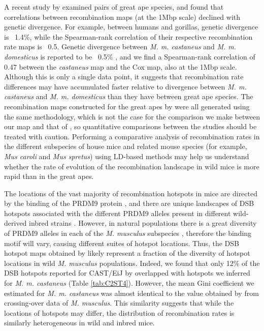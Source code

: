 A recent study by \cite{RN221} examined pairs of great ape species, and found that correlations between recombination maps (at the 1Mbp scale) declined with genetic divergence. For example, between humans and gorillas, genetic divergence is ~1.4\%, while the Spearman-rank correlation of their respective recombination rate maps is ~0.5. Genetic divergence between \textit{M. m. castaneus} and \textit{M. m. domesticus} is reported to be ~0.5\% \citep{RN255}, and we find a Spearman-rank correlation of 0.47 between the \textit{castaneus} map and the Cox map, also at the 1Mbp scale. Although this is only a single data point, it suggests that recombination rate differences may have accumulated faster relative to divergence between \textit{M. m. castaneus} and \textit{M. m. domesticus} than they have between great ape species. The recombination maps constructed for the great apes by \cite{RN221}  were all generated using the same methodology, which is not the case for the comparison we make between our map and that of \cite{RN232}, so quantitative comparisons between the studies should be treated with caution. Performing a comparative analysis of recombination rates in the different subspecies of house mice and related mouse species (for example, \textit{Mus caroli} and \textit{Mus spretus}) using LD-based methods may help us understand whether the rate of evolution of the recombination landscape in wild mice is more rapid than in the great apes.

The locations of the vast majority of recombination hotspots in mice are directed by the binding of the PRDM9 protein \citep{RN254}, and there are unique landscapes of DSB hotspots associated with the different PRDM9 alleles present in different wild-derived inbred strains \citep{RN249}. However, in natural populations there is a great diversity of PRDM9 alleles in each of the \textit{M. musculus} subspecies \citep{RN292}, therefore the binding motif will vary, causing different suites of hotspot locations. Thus, the DSB hotspot maps obtained by \cite{RN249} likely represent a fraction of the diversity of hotspot locations in wild \textit{M. musculus} populations. Indeed, we found that only 12\% of the DSB hotspots reported for CAST/EiJ by \cite{RN249} overlapped with hotspots we inferred for \textit{M. m. castaneus} (Table \ref{tab:C2ST4}). However, the mean Gini coefficient we estimated for \textit{M. m. castaneus} was almost identical to the value obtained by \cite{RN333} from crossing-over data of \textit{M. musculus}. This similarity suggests that while the locations of hotspots may differ, the distribution of recombination rates is similarly heterogeneous in wild and inbred mice.

